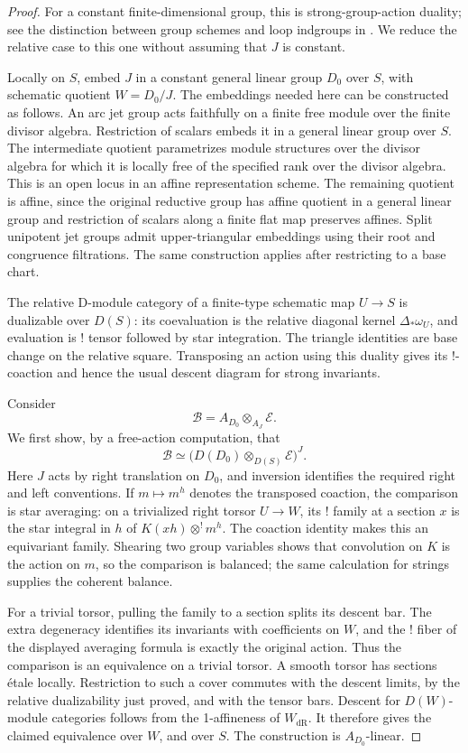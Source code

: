 \begin{proof}
For a constant finite-dimensional group, this is strong-group-action
duality; see the distinction between group schemes and loop indgroups
in \cite[Section~1.5.4]{RaskinW}.  We reduce the relative case to this
one without assuming that $J$ is constant.

Locally on $S$, embed $J$ in a constant general linear group $D_0$ over
$S$, with schematic quotient $W=D_0/J$.  The embeddings needed here
can be constructed as follows.  An arc jet group acts faithfully on a
finite free module over the finite divisor algebra.  Restriction of
scalars embeds it in a general linear group over $S$.  The intermediate
quotient parametrizes module structures over the divisor algebra for which it is
locally free of the specified rank over the divisor algebra.  This is
an open locus in an affine representation scheme.  The remaining
quotient is affine, since the original reductive group has affine
quotient in a general linear group and restriction of scalars along a
finite flat map preserves affines.  Split unipotent jet groups admit
upper-triangular embeddings using their root and congruence filtrations.
The same construction applies after restricting to a base chart.

The relative D-module category of a finite-type schematic map $U\to S$
is dualizable over $D(S)$: its coevaluation is the relative diagonal
kernel $\Delta_*\omega_U$, and evaluation is ! tensor followed by star
integration.  The triangle identities are base change on the relative
square.  Transposing an action using this duality gives its !-coaction
and hence the usual descent diagram for strong invariants.

Consider
\[
            \mathcal B=A_{D_0}\otimes_{A_J}\mathcal E.
\]
We first show, by a free-action computation, that
\[
       \mathcal B\simeq
          \bigl(D(D_0)\otimes_{D(S)}\mathcal E\bigr)^J.
\]
Here $J$ acts by right translation on $D_0$, and inversion identifies
the required right and left conventions.  If $m\mapsto m^h$ denotes
the transposed coaction, the comparison is star averaging: on a
trivialized right torsor $U\to W$, its ! family at a section $x$ is
the star integral in $h$ of
$K(xh)\otimes^!m^h$.  The coaction identity makes this an equivariant
family.  Shearing two group variables shows that convolution on $K$
is the action on $m$, so the comparison is balanced; the same
calculation for strings supplies the coherent balance.

For a trivial torsor, pulling the family to a section splits its
descent bar.  The extra degeneracy identifies its invariants with
coefficients on $W$, and the ! fiber of the displayed averaging
formula is exactly the original action.  Thus the comparison is an
equivalence on a trivial torsor.  A smooth torsor has sections \'etale
locally.  Restriction to such a cover commutes with the descent limits,
by the relative dualizability just proved, and with the tensor bars.
Descent for $D(W)$-module categories follows from the 1-affineness of
$W_{\mathrm{dR}}$.  It therefore gives the claimed equivalence over
$W$, and over $S$.  The construction is $A_{D_0}$-linear.


\end{proof}
